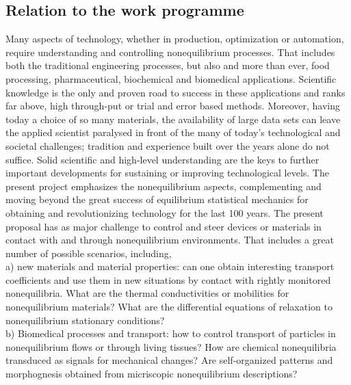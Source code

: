\subsection{Relation to the work programme}\label{sec:relation-wp}


Many aspects of technology, whether in production, optimization or automation, require understanding and controlling nonequilibrium processes.  That includes both the traditional engineering processes, but also and more than ever, food processing, pharmaceutical, biochemical and biomedical applications.  Scientific knowledge is the only and proven road to success in these applications and ranks far above, high through-put or trial and error based methods.  Moreover, having today a choice of so many materials, the availability of large data sets can leave the applied scientist paralysed in front of the many of today's technological and societal challenges; tradition and experience built over the years alone do not suffice.  Solid scientific and high-level understanding are the keys to further important developments for sustaining or improving technological levels.  The present project emphasizes the nonequilibrium aspects, complementing and moving beyond the great success of equilibrium statistical mechanics for obtaining and revolutionizing technology for the last 100 years.
The present proposal has as major challenge to control and steer devices or materials in contact with and through nonequilibrium environments.  That includes a great number of possible scenarios, including,\\
a) new materials and material properties:  can one obtain interesting transport coefficients and use them in new situations by contact with rightly monitored nonequilibria.  What are the thermal conductivities or mobilities for nonequilibrium materials?  What are the differential equations of relaxation to nonequilibrium stationary conditions?\\
b) Biomedical processes and transport: how to control transport of particles in nonequilibrium flows or through living tissues?  How are chemical nonequilibria transduced as signals for mechanical changes? Are self-organized patterns and morphognesis obtained from micriscopic nonequilibrium descriptions?\\
